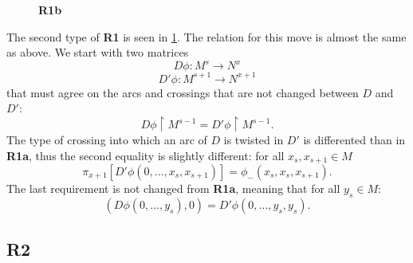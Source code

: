 \begin{figure}[h!]\centering 
  \caption{\textbf{R1b}\label{R1b}}
  \medskip


\end{figure}

The second type of \textbf{R1} is seen in \cref{R1b}. The relation for this move is almost the same as above. We start with two matrices
$$D\phi:M^s\to N^x$$
$$D'\phi:M^{s+1}\to N^{x+1}$$
that must agree on the arcs and crossings that are not changed between $D$ and $D'$:
$$D\phi\restriction M^{s-1}=D'\phi\restriction M^{s-1}.$$
The type of crossing into which an arc of $D$ is twisted in $D'$ is differented than in \textbf{R1a}, thus the second equality is slightly different: for all $x_s, x_{s+1}\in M$
$$\pi_{x+1}[D'\phi(0,..., x_s, x_{s+1})]=\phi_-(x_{s},x_s,x_{s+1}).$$
The last requirement is not changed from \textbf{R1a}, meaning that for all $y_s\in M$:
$$(D\phi(0,..., y_s), 0)=D'\phi(0,..., y_s, y_s).$$

\subsection*{\centering R2}

